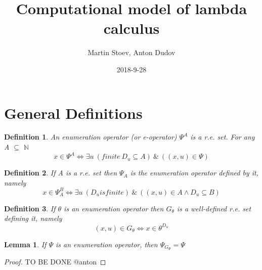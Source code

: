 \documentclass{article}
\title{Computational model of lambda calculus}
\date{2018-9-28}
\author{Martin Stoev, Anton Dudov}
\newtheorem{lemma}[theorem]{Lemma} %
\newtheorem{definition}{Definition}[section] %
\begin{document}
	\maketitle

	\newpage
	\doublespacing
	\tableofcontents
	\singlespacing

	\newpage

	\section{General Definitions}
		\begin{definition}
			An enumeration operator (or e-operator) $\Psi^A$ is a r.e. set. For any A $\subseteq$ $\mathbb{N}$
			\begin{equation}
				x \in \Psi^A \iff \exists u \:(finite \: D_u \subseteq A) \:\&\: ((x, u) \in \Psi)
			\end{equation}
		\end{definition}
			
		\begin{definition}
			If A is a r.e. set then $\Psi_A$ is the enumeration operator defined by it, namely
			\begin{equation}
				x \in \Psi^B_A \iff \exists u \: (D_u is finite) \:\&\: ((x, u) \in A \land D_u \subseteq B)
			\end{equation}
		\end{definition}
		
		\begin{definition}
			If $\theta$ is an enumeration operator then $G_\theta$ is a well-defined r.e. set defining it, namely
			\begin{equation}
				(x, u) \in G_\theta \iff x \in \theta^{D_u}
			\end{equation}
		\end{definition}

	\begin{lemma}
		If $\Psi$ is an enumeration operator, then $\Psi_{G_{\Psi}} = \Psi$
	\end{lemma}	
	\begin{proof}
		TO BE DONE @anton
	\end{proof}
\end{document}
